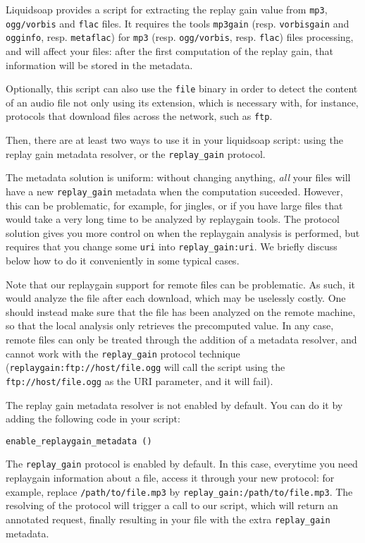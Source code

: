 \documentclass{book}
\begin{document}
Liquidsoap provides a script for extracting the replay gain value from
\verb+mp3+, \verb+ogg/vorbis+ and \verb+flac+ files. It requires the tools
\verb+mp3gain+ (resp. \verb+vorbisgain+ and \verb+ogginfo+,
resp. \verb+metaflac+) for \verb+mp3+ (resp. \verb+ogg/vorbis+,
resp. \verb+flac+) files processing, and will affect your files: after the first
computation of the replay gain, that information will be stored in the metadata.

Optionally, this script can also use the \verb+file+ binary in order to detect
the content of an audio file not only using its extension, which is necessary
with, for instance, protocols that download files across the network, such as
\verb+ftp+.

Then, there are at least two ways to use it in your liquidsoap script: using the
replay gain metadata resolver, or the \verb+replay_gain+ protocol.

The metadata solution is uniform: without changing anything, \emph{all} your
files will have a new \verb+replay_gain+ metadata when the computation
suceeded. However, this can be problematic, for example, for jingles, or if you
have large files that would take a very long time to be analyzed by replaygain
tools.  The protocol solution gives you more control on when the replaygain
analysis is performed, but requires that you change some \verb+uri+ into
\verb+replay_gain:uri+.  We briefly discuss below how to do it conveniently in
some typical cases.

Note that our replaygain support for remote files can be problematic.  As such,
it would analyze the file after each download, which may be uselessly
costly. One should instead make sure that the file has been analyzed on the
remote machine, so that the local analysis only retrieves the precomputed
value. In any case, remote files can only be treated through the addition of a
metadata resolver, and cannot work with the \verb+replay_gain+ protocol
technique (\verb+replaygain:ftp://host/file.ogg+ will call the script using the
\verb+ftp://host/file.ogg+ as the URI parameter, and it will fail).

The replay gain metadata resolver is not enabled by default. You can do it by
adding the following code in your script:
\begin{verbatim}
enable_replaygain_metadata ()
\end{verbatim}
The \verb+replay_gain+ protocol is enabled by default.  In this case, everytime
you need replaygain information about a file, access it through your new
protocol: for example, replace \verb+/path/to/file.mp3+ by
\verb+replay_gain:/path/to/file.mp3+.  The resolving of the protocol will
trigger a call to our script, which will return an annotated request, finally
resulting in your file with the extra \verb+replay_gain+ metadata.
\end{document}
